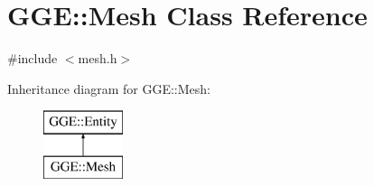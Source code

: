 \hypertarget{class_g_g_e_1_1_mesh}{\section{G\+G\+E\+:\+:Mesh Class Reference}
\label{class_g_g_e_1_1_mesh}
}


{\ttfamily \#include $<$mesh.\+h$>$}

Inheritance diagram for G\+G\+E\+:\+:Mesh\+:\begin{figure}[H]
\begin{center}
\leavevmode
\includegraphics[height=2.000000cm]{class_g_g_e_1_1_mesh}
\end{center}
\end{figure}
